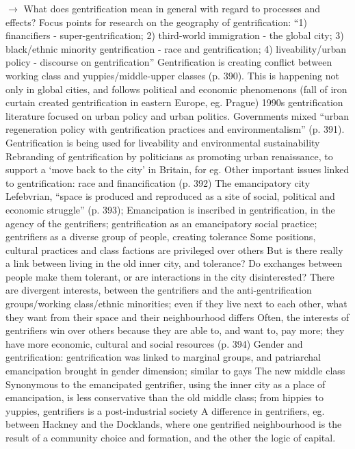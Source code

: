 \documentclass{article}
\begin{document}
\begin{outline}
	\1 $\rightarrow$ What does gentrification mean in general with regard to processes and effects?
	\1 Focus points for research on the geography of gentrification: ``1) financifiers - super-gentrification; 2) third-world immigration - the global city; 3) black/ethnic minority gentrification - race and gentrification; 4) liveability/urban policy - discourse on gentrification''
	\1 Gentrification is creating conflict between working class and yuppies/middle-upper classes (p. 390). This is happening not only in global cities, and follows political and economic phenomenons (fall of iron curtain created gentrification in eastern Europe, eg. Prague)
	\1 1990s gentrification literature focused on urban policy and urban politics. Governments mixed ``urban regeneration policy with gentrification practices and environmentalism'' (p. 391). Gentrification is being used for liveability and environmental sustainability
	\1 Rebranding of gentrification by politicians as promoting urban renaissance, to support a `move back to the city' in Britain, for eg.
	\1 Other important issues linked to gentrification: race and financification (p. 392)
	\1 The emancipatory city
		\2 Lefebvrian, ``space is produced and reproduced as a site of social, political and economic struggle'' (p. 393); 
		\2 Emancipation is inscribed in gentrification, in the agency of the gentrifiers; gentrification as an emancipatory social practice; gentrifiers as a diverse group of people, creating tolerance
			\3 Some positions, cultural practices and class factions are privileged over others
		\2 But is there really a link between living in the old inner city, and tolerance? Do exchanges between people make them tolerant, or are interactions in the city disinterested?
			\3 There are divergent interests, between the gentrifiers and the anti-gentrification groups/working class/ethnic minorities; even if they live next to each other, what they want from their space and their neighbourhood differs
			\3 Often, the interests of gentrifiers win over others because they are able to, and want to, pay more; they have more economic, cultural and social resources (p. 394)
		\2 Gender and gentrification: gentrification was linked to marginal groups, and patriarchal emancipation brought in gender dimension; similar to gays
	\1 The new middle class
		\2 Synonymous to the emancipated gentrifier, using the inner city as a place of emancipation, is less conservative than the old middle class; from hippies to yuppies, gentrifiers is a post-industrial society
		\2 A difference in gentrifiers, eg. between Hackney and the Docklands, where one gentrified neighbourhood is the result of a community choice and formation, and the other the logic of capital. 

\end{outline}
\end{document}
